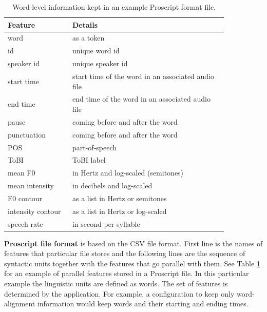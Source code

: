 \begin{table}[th]
  
  \centering
  \begin{tabular}{>{\arraybackslash} m{0.25\linewidth} | >{\arraybackslash} m{0.6\linewidth} }
    \toprule
    \textbf{Feature} & \textbf{Details} \\
    \midrule
    word                         & as a token                                           \\
    id							 & unique word id				                        \\
    speaker id                   & unique speaker id                                    \\
    start time                   & start time of the word in an associated audio file   \\
    end time                     & end time of the word in an associated audio file     \\
    pause                        & coming before and after the word                     \\
    punctuation                  & coming before and after the word                     \\
    POS                          & part-of-speech                                       \\
    ToBI                         & ToBI label                                           \\
    mean F0                      & in Hertz and log-scaled (semitones)                   \\
    mean intensity               & in decibels and log-scaled                            \\
    F0 contour                   & as a list in Hertz or semitones                      \\
    intensity contour            & as a list in Hertz or log-scaled                      \\
    speech rate                  & in second per syllable            \\
    \bottomrule
  \end{tabular}
  \caption{Word-level information kept in an example Proscript format file.}
  \label{tab:proscript}
\end{table}

\textbf{Proscript file format} is based on the CSV file format. First line is the names of features that particular file stores and the following lines are the sequence of syntactic units together with the features that go parallel with them. See Table \ref{tab:proscript} for an example of parallel features stored in a Proscript file. In this particular example the linguistic units are defined as words. The set of features is determined by the application. For example, a configuration to keep only word-alignment information would keep words and their starting and ending times. 

